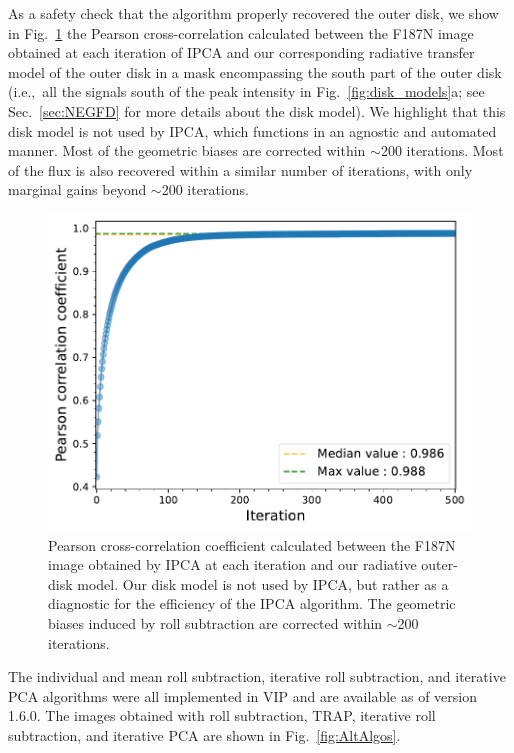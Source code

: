 \documentclass[longauth]{aa}
\begin{document}
\begin{appendix}
As a safety check that the algorithm properly recovered the outer disk, we show in Fig.~\ref{fig:cross-corr_IPCA_model} the Pearson cross-correlation calculated between the F187N image obtained at each iteration of IPCA and our corresponding radiative transfer model of the outer disk in a mask encompassing the south part of the outer disk (i.e.,~all the signals south of the peak intensity in Fig.~\ref{fig:disk_models}a; see Sec.~\ref{sec:NEGFD} for more details about the disk model). We highlight that this disk model is not used by IPCA, which functions in an agnostic and automated manner. Most of the geometric biases are corrected within $\sim$200 iterations. Most of the flux is also recovered within a similar number of iterations, with only marginal gains beyond $\sim$200 iterations.

\begin{figure}[h]
\centering
\includegraphics[width=\columnwidth]{Cross-corr_F187N_IPCA_vs_model.pdf}
\caption{Pearson cross-correlation coefficient calculated between the F187N image obtained by IPCA at each iteration and our radiative outer-disk model. Our disk model is not used by IPCA, but rather as a diagnostic for the efficiency of the IPCA algorithm. The geometric biases induced by roll subtraction are corrected within $\sim$200 iterations.}
\label{fig:cross-corr_IPCA_model}
\end{figure}
    
The individual and mean roll subtraction, iterative roll subtraction, and iterative PCA algorithms were all implemented in VIP and are available as of version 1.6.0. The images obtained with roll subtraction, TRAP, iterative roll subtraction, and iterative PCA are shown in Fig.~\ref{fig:AltAlgos}.


\end{appendix}
\end{document}
